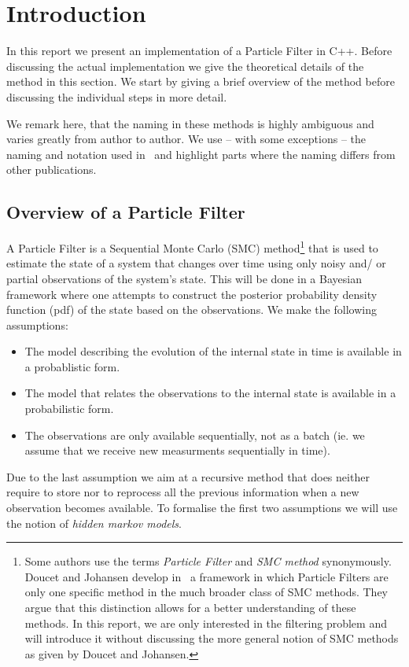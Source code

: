 \section*{Introduction}\label{sec:intro}
In this report we present an implementation of a Particle Filter in
C++. Before discussing the actual implementation we give the
theoretical details of the method in this section. We start by giving
a brief overview of the method before discussing the individual steps
in more detail.

We remark here, that the naming in these methods is highly ambiguous
and varies greatly from author to author. We use -- with some
exceptions -- the naming and notation used in~\cite{doucet} and
highlight parts where the naming differs from other publications.

\subsection*{Overview of a Particle Filter}
A Particle Filter is a Sequential Monte Carlo (SMC)
method\footnote{Some authors use the terms \emph{Particle Filter} and
  \emph{SMC method} synonymously. Doucet and Johansen develop
  in~\cite{doucet} a framework in which Particle Filters are only one
  specific method in the much broader class of SMC methods. They argue
  that this distinction allows for a better understanding of these
  methods. In this report, we are only interested in the filtering
  problem and will introduce it without discussing the more general
  notion of SMC methods as given by Doucet and Johansen.} that is used
to estimate the state of a system that changes over time using only
noisy and/ or partial observations of the system's state. This will be
done in a Bayesian framework where one attempts to construct the
posterior probability density function (pdf) of the state based on the
observations. We make the following assumptions:
\begin{itemize}
\item The model describing the evolution of the internal state in time
  is available in a probablistic form.
\item The model that relates the observations to the internal state is
  available in a probabilistic form.
\item The observations are only available sequentially, not as a batch
  (ie. we assume that we receive new measurments sequentially in
  time).
\end{itemize}
Due to the last assumption we aim at a recursive method that does
neither require to store nor to reprocess all the previous information
when a new observation becomes available. To formalise the first two
assumptions we will use the notion of \emph{hidden markov models}.

